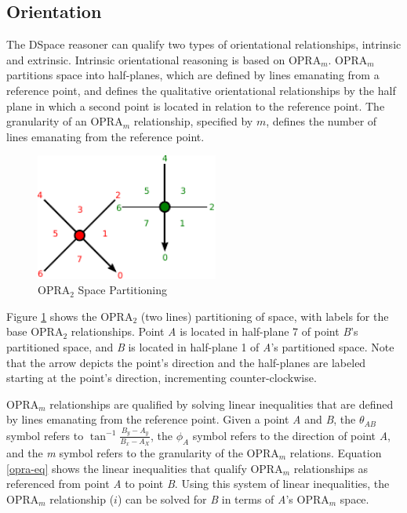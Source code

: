 \documentclass[12pt]{ucthesis}
\begin{document}
\subsection{Orientation} \label{orientation}
The DSpace reasoner can qualify two types of orientational relationships, intrinsic and extrinsic. Intrinsic orientational reasoning is based on OPRA$_{m}$. OPRA$_{m}$ partitions space into half-planes, which are defined by lines emanating from a reference point, and defines the qualitative orientational relationships by the half plane in which a second point is located in relation to the reference point. The granularity of an OPRA$_{m}$ relationship, specified by $m$, defines the number of lines emanating from the reference point. 

\begin{figure}[H]
\centering
\includegraphics[width=60mm]{facing-opra-base-rel}
\caption{OPRA$_{2}$ Space Partitioning}
\label{facing-opra-base-rel}
\end{figure}

Figure \ref{facing-opra-base-rel} shows the OPRA$_{2}$ (two lines) partitioning of space, with labels for the base OPRA$_{2}$ relationships. Point \emph{A} is located in half-plane 7 of point \emph{B}'s partitioned space, and \emph{B} is located in half-plane 1 of \emph{A}'s partitioned space. Note that the arrow depicts the point's direction and the half-planes are labeled starting at the point's direction, incrementing counter-clockwise. 

OPRA$_{m}$ relationships are qualified by solving linear inequalities that are defined by lines emanating from the reference point. Given a point \emph{A} and \emph{B}, the $\theta_{AB}$ symbol refers to $ \tan^{-1} \frac{B_{y} - A_{y}}{B_{x} - A_{X}} $, the $\phi_{A}$ symbol refers to the direction of point \emph{A}, and the \emph{m} symbol refers to the granularity of the OPRA$_{m}$ relations. Equation \ref{opra-eq} shows the linear inequalities that qualify OPRA$_{m}$ relationships as referenced from point \emph{A} to point \emph{B}. Using this system of linear inequalities, the OPRA$_{m}$ relationship ($i$) can be solved for \emph{B} in terms of \emph{A}'s OPRA$_{m}$ space.
\end{document}
